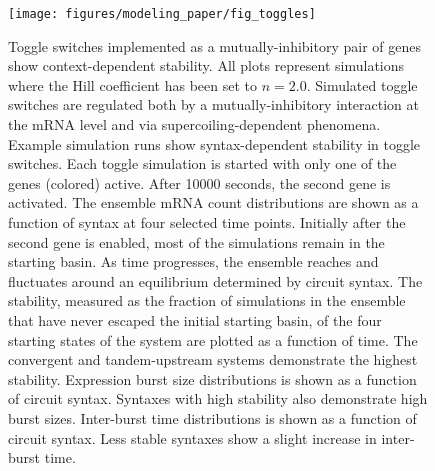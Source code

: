 \documentclass[11pt]{article}
\begin{document}
\begin{figure}[htbp]
    \centering
    {\texttt{[image: figures/modeling\_paper/fig\_toggles]}
    \label{fig:toggle_cartoon}
    \label{fig:toggle_orientation_examples}
    \label{fig:toggle_basin_stability_over_time}
    \label{fig:toggle_stable_frac_n_2.0}
    \label{fig:toggle_burst_size}
    \label{fig:toggle_interburst_time}
    }
\end{figure}
\begin{figure}[htbp]
    \ContinuedFloat
    \caption{Toggle switches implemented as a mutually-inhibitory pair of genes show context-dependent stability. All plots represent simulations where the Hill coefficient has been set to \(n = 2.0\).
     Simulated toggle switches are regulated both by a mutually-inhibitory interaction at the mRNA level and via supercoiling-dependent phenomena. 
     Example simulation runs show syntax-dependent stability in toggle switches. Each toggle simulation is started with only one of the genes (colored) active. After 10000 seconds, the second gene is activated.
     The ensemble mRNA count distributions are shown as a function of syntax at four selected time points. Initially after the second gene is enabled, most of the simulations remain in the starting basin. As time progresses, the ensemble reaches and fluctuates around an equilibrium determined by circuit syntax.
     The stability, measured as the fraction of simulations in the ensemble that have never escaped the initial starting basin, of the four starting states of the system are plotted as a function of time. The convergent and tandem-upstream systems demonstrate the highest stability.
     Expression burst size distributions is shown as a function of circuit syntax. Syntaxes with high stability also demonstrate high burst sizes.
     Inter-burst time distributions is shown as a function of circuit syntax. Less stable syntaxes show a slight increase in inter-burst time.
} \label{fig:top:toggle_switch}
\end{figure}
\end{document}
